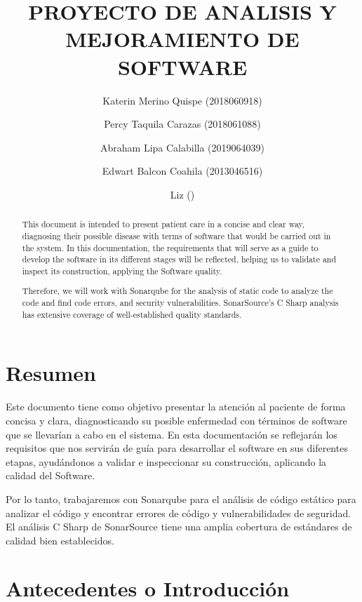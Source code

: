 \documentclass[preprint,12pt]{elsarticle}
\begin{document}
	
	\begin{frontmatter}

		\title{\huge  PROYECTO DE  ANALISIS Y  MEJORAMIENTO DE  SOFTWARE }
		\author{Katerin Merino Quispe  (2018060918)}
		\author{Percy Taquila Carazas  (2018061088)}
		\author{Abraham Lipa Calabilla (2019064039)}
		\author{Edwart Balcon Coahila  (2013046516)}
		\author{Liz                ()}
		\address{Tacna, Perú}
		
\begin{abstract}
This document is intended to present patient care in a concise and clear way, diagnosing their possible disease with terms of software that would be carried out in the system. In this documentation, the requirements that will serve as a guide to develop the software in its different stages will be reflected, helping us to validate and inspect its construction, applying the Software quality.

Therefore, we will work with Sonarqube for the analysis of static code to analyze the code and find code errors, and security vulnerabilities. SonarSource's C Sharp analysis has extensive coverage of well-established quality standards.  
\end{abstract}

\end{frontmatter}

\section*{Resumen}

Este documento tiene como objetivo presentar la atención al paciente de forma concisa y clara, diagnosticando su posible enfermedad con términos de software que se llevarían a cabo en el sistema. En esta documentación se reflejarán los requisitos que nos servirán de guía para desarrollar el software en sus diferentes etapas, ayudándonos a validar e inspeccionar su construcción, aplicando la calidad del Software.

Por lo tanto, trabajaremos con Sonarqube para el análisis de código estático para analizar el código y encontrar errores de código y vulnerabilidades de seguridad. El análisis C Sharp de SonarSource tiene una amplia cobertura de estándares de calidad bien establecidos.

\section{Antecedentes o Introducción}
\end{document}
